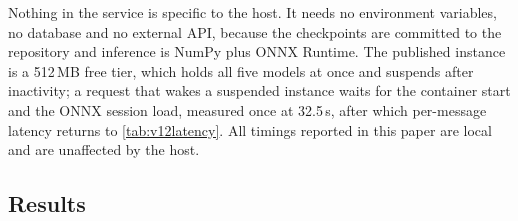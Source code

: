 \documentclass[11pt,a4paper]{article}
\theoremstyle{remark}
\begin{document}
Nothing in the service is specific to the host. It needs no environment
variables, no database and no external API, because the checkpoints are
committed to the repository and inference is NumPy plus ONNX Runtime. The
published instance is a 512\,MB free tier, which holds all five models at
once and suspends after inactivity; a request that wakes a suspended instance
waits for the container start and the ONNX session load, measured once at
32.5\,s, after which per-message latency returns to \cref{tab:v12latency}. All
timings reported in this paper are local and are unaffected by the host.

\subsection{Results}
\label{sec:v12results}
\end{document}
